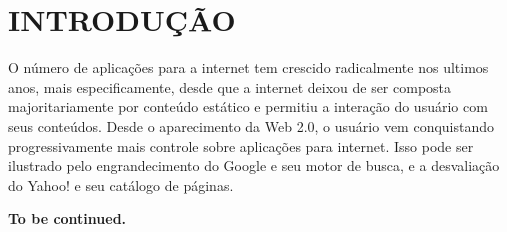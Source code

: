 \chapter{INTRODUÇÃO}

O número de aplicações para a internet tem crescido radicalmente nos ultimos anos, mais especificamente, desde que a internet deixou de ser composta majoritariamente por conteúdo estático e permitiu a interação do usuário com seus conteúdos. Desde o aparecimento da Web 2.0, o usuário vem conquistando progressivamente mais controle sobre aplicações para internet. Isso pode ser ilustrado pelo engrandecimento do Google e seu motor de busca, e a desvaliação do Yahoo! e seu catálogo de páginas.

\textbf{To be continued.}





